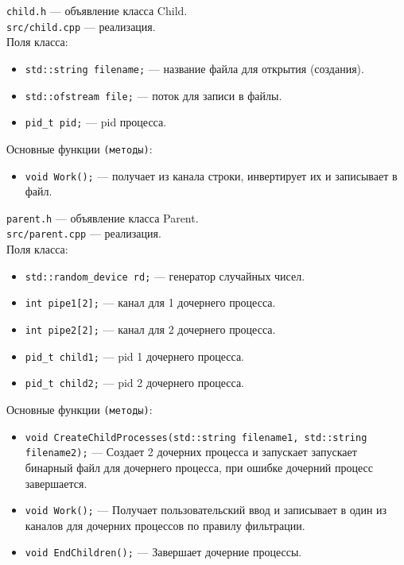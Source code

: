 \texttt{child.h} --- объявление класса Child. \\
\texttt{src/child.cpp} --- реализация.\\
Поля класса:
\begin{itemize}
\item \texttt{std::string filename;}  --- название файла для открытия (создания).
\item \texttt{std::ofstream file;}  --- поток для записи в файлы.
\item \texttt{pid\_t pid;}  --- pid процесса.
\end{itemize}
Основные функции \texttt{(методы)}:
\begin{itemize}
\item \texttt{void Work();} --- получает из канала строки, инвертирует их и записывает в файл.
\end{itemize}

\vspace{2\baselineskip}


\texttt{parent.h} --- объявление класса Parent.\\
\texttt{src/parent.cpp} --- реализация.\\
Поля класса:
\begin{itemize}
\item \texttt{std::random\_device rd;}  --- генератор случайных чисел.
\item \texttt{int pipe1[2];}  --- канал для 1 дочернего процесса.
\item \texttt{int pipe2[2];}  --- канал для 2 дочернего процесса.
\item \texttt{pid\_t child1;}  --- pid 1 дочернего процесса.
\item \texttt{pid\_t child2;}  --- pid 2 дочернего процесса.
\end{itemize}
Основные функции \texttt{(методы)}:
\begin{itemize}
\item \texttt{void CreateChildProcesses(std::string filename1, std::string filename2);} --- Создает 2 дочерних процесса и запускает запускает бинарный файл для дочернего процесса, при ошибке дочерний процесс завершается.
\item \texttt{void Work();} --- Получает пользовательский ввод и записывает в один из каналов для дочерних процессов по правилу фильтрации.
\item \texttt{void EndChildren();} --- Завершает дочерние процессы.
\end{itemize} 
